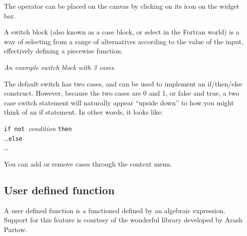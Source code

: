 \label{SwitchIcon}


The operator can be placed on the canvas by clicking on its icon on
the widget bar.

A switch block (also known as a case block, or select in the Fortran
world) is a way of selecting from a range of alternatives according
to the value of the input, effectively defining a piecewise function.
\begin{center}
 {\em
An example switch block with 3 cases} 
\par\end{center}

The default switch has two cases, and can be used to implement an
if/then/else construct. However, because the two cases are 0 and 1,
or false and true, a two case switch statement will naturally appear
``upside down'' to how you might think of an if statement. In other
words, it looks like:

\noindent\parbox[c]{1\textwidth}{%
 \texttt{if not }{\em condition} \texttt{then}\\
 \ldots\texttt{else}\\
 \ldots %
}

You can add or remove cases through the context menu.

\subsection{User defined function}

\label{Operation:userFunction}\label{UserFunction}


A user defined function is a functioned defined by an algebraic expression.
Support for this feature is courtesy of the wonderful 
library developed by Arash Partow.

